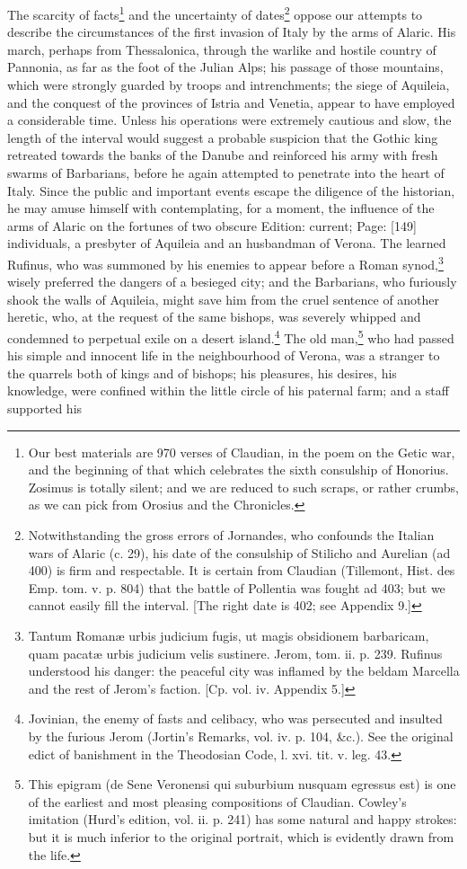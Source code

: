 The scarcity of facts\footnote{Our best materials are 970 verses of Claudian, in the poem on the Getic war, and the beginning of that which celebrates the sixth consulship of Honorius. Zosimus is totally silent; and we are reduced to such scraps, or rather crumbs, as we can pick from Orosius and the Chronicles.} and the uncertainty of dates\footnote{Notwithstanding the gross errors of Jornandes, who confounds the Italian wars of Alaric (c. 29), his date of the consulship of Stilicho and Aurelian (ad 400) is firm and respectable. It is certain from Claudian (Tillemont, Hist. des Emp. tom. v. p. 804) that the battle of Pollentia was fought ad 403; but we cannot easily fill the interval. [The right date is 402; see Appendix 9.]} oppose our attempts to describe the circumstances of the first invasion of Italy by the arms of Alaric. His march, perhaps from Thessalonica, through the warlike and hostile country of Pannonia, as far as the foot of the Julian Alps; his passage of those mountains, which were strongly guarded by troops and intrenchments; the siege of Aquileia, and the conquest of the provinces of Istria and Venetia, appear to have employed a considerable time. Unless his operations were extremely cautious and slow, the length of the interval would suggest a probable suspicion that the Gothic king retreated towards the banks of the Danube and reinforced his army with fresh swarms of Barbarians, before he again attempted to penetrate into the heart of Italy. Since the public and important events escape the diligence of the historian, he may amuse himself with contemplating, for a moment, the influence of the arms of Alaric on the fortunes of two obscure Edition: current; Page: [149] individuals, a presbyter of Aquileia and an husbandman of Verona. The learned Rufinus, who was summoned by his enemies to appear before a Roman synod,\footnote{Tantum Romanæ urbis judicium fugis, ut magis obsidionem barbaricam, quam pacatæ urbis judicium velis sustinere. Jerom, tom. ii. p. 239. Rufinus understood his danger: the peaceful city was inflamed by the beldam Marcella and the rest of Jerom\texthebrew{}’s faction. [Cp. vol. iv. Appendix 5.]} wisely preferred the dangers of a besieged city; and the Barbarians, who furiously shook the walls of Aquileia, might save him from the cruel sentence of another heretic, who, at the request of the same bishops, was severely whipped and condemned to perpetual exile on a desert island.\footnote{Jovinian, the enemy of fasts and celibacy, who was persecuted and insulted by the furious Jerom (Jortin\texthebrew{}’s Remarks, vol. iv. p. 104, \&c.). See the original edict of banishment in the Theodosian Code, l. xvi. tit. v. leg. 43.} The old man,\footnote{This epigram (de Sene Veronensi qui suburbium nusquam egressus est) is one of the earliest and most pleasing compositions of Claudian. Cowley\texthebrew{}’s imitation (Hurd\texthebrew{}’s edition, vol. ii. p. 241) has some natural and happy strokes: but it is much inferior to the original portrait, which is evidently drawn from the life.} who had passed his simple and innocent life in the neighbourhood of Verona, was a stranger to the quarrels both of kings and of bishops; his pleasures, his desires, his knowledge, were confined within the little circle of his paternal farm; and a staff supported his 